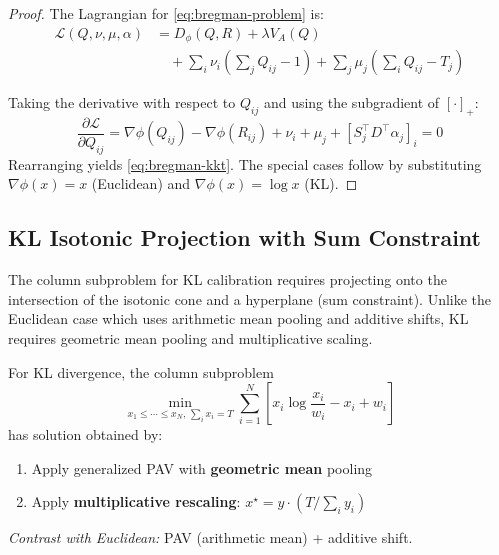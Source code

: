 \begin{proof}
The Lagrangian for \eqref{eq:bregman-problem} is:
\begin{align}
\mathcal{L}(Q, \nu, \mu, \alpha) &= D_\phi(Q, R) + \lambda V_A(Q) \\
&\quad + \sum_i \nu_i \left(\sum_j Q_{ij} - 1\right) + \sum_j \mu_j \left(\sum_i Q_{ij} - T_j\right) \nonumber
\end{align}

Taking the derivative with respect to $Q_{ij}$ and using the subgradient of $[\cdot]_+$:
\[
\frac{\partial \mathcal{L}}{\partial Q_{ij}} = \nabla\phi(Q_{ij}) - \nabla\phi(R_{ij}) + \nu_i + \mu_j + [S_j^\top D^\top \alpha_j]_i = 0
\]
Rearranging yields \eqref{eq:bregman-kkt}. The special cases follow by substituting
$\nabla\phi(x) = x$ (Euclidean) and $\nabla\phi(x) = \log x$ (KL).
\end{proof}


\subsection{KL Isotonic Projection with Sum Constraint}

The column subproblem for KL calibration requires projecting onto the intersection
of the isotonic cone and a hyperplane (sum constraint). Unlike the Euclidean case
which uses arithmetic mean pooling and additive shifts, KL requires geometric mean
pooling and multiplicative scaling.

\begin{lemma}
\label{lem:kl-column}
For KL divergence, the column subproblem
\begin{equation}
\min_{x_1 \leq \cdots \leq x_N, \, \sum_i x_i = T} \sum_{i=1}^N \left[x_i \log\frac{x_i}{w_i} - x_i + w_i\right]
\label{eq:kl-column}
\end{equation}
has solution obtained by:
\begin{enumerate}
\item Apply generalized PAV with \textbf{geometric mean} pooling
\item Apply \textbf{multiplicative rescaling}: $x^\star = y \cdot (T / \sum_i y_i)$
\end{enumerate}

\noindent\textit{Contrast with Euclidean:} PAV (arithmetic mean) + additive shift.
\end{lemma}

